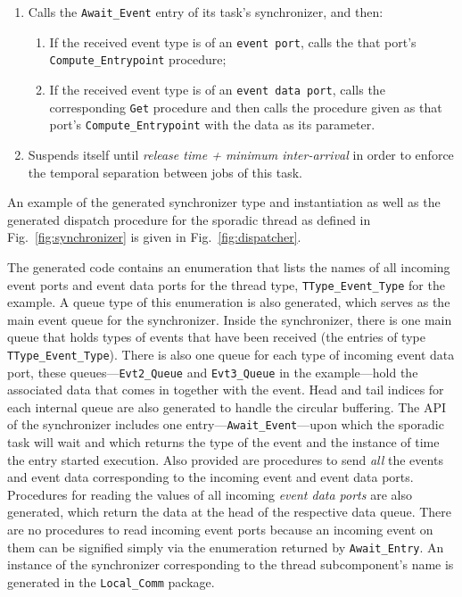 \begin{enumerate}
\item{Calls the \texttt{Await\_Event} entry of its task's
  synchronizer, and then:
  \begin{enumerate}
  \item{If the received event type is of an \texttt{event port}, calls
    the that port's \texttt{Compute\_Entrypoint} procedure;}
  \item{If the received event type is of an \texttt{event data port},
    calls the corresponding \texttt{Get} procedure and then calls the
    procedure given as that port's \texttt{Compute\_Entrypoint} with
    the data as its parameter.}
  \end{enumerate}}
\item{Suspends itself until \emph{release time + minimum
    inter-arrival} in order to enforce the temporal separation
  between jobs of this task.}
\end{enumerate}

An example of the generated synchronizer type and instantiation as
well as the generated dispatch procedure for the sporadic thread as
defined in Fig.~\ref{fig:synchronizer} is given in
Fig.~\ref{fig:dispatcher}.

The generated code contains an enumeration that lists the names of all
incoming event ports and event data ports for the thread type,
\texttt{TType\_Event\_Type} for the example. A queue type of this
enumeration is also generated, which serves as the main event queue
for the synchronizer. Inside the synchronizer, there is one main queue
that holds types of events that have been received (the entries of
type \texttt{TType\_Event\_Type}). There is also one queue for each
type of incoming event data port, these queues---\texttt{Evt2\_Queue}
and \texttt{Evt3\_Queue} in the example---hold the associated data
that comes in together with the event. Head and tail indices for each
internal queue are also generated to handle the circular
buffering. The API of the synchronizer includes one
entry---\texttt{Await\_Event}---upon which the sporadic task will wait
and which returns the type of the event and the instance of time the
entry started execution. Also provided are procedures to send
\emph{all} the events and event data corresponding to the incoming
event and event data ports. Procedures for reading the values of all
incoming \emph{event data ports} are also generated, which return the
data at the head of the respective data queue. There are no procedures
to read incoming event ports because an incoming event on them can be
signified simply via the enumeration returned by
\texttt{Await\_Entry}. An instance of the synchronizer corresponding
to the thread subcomponent's name is generated in the
\texttt{Local\_Comm} package.

